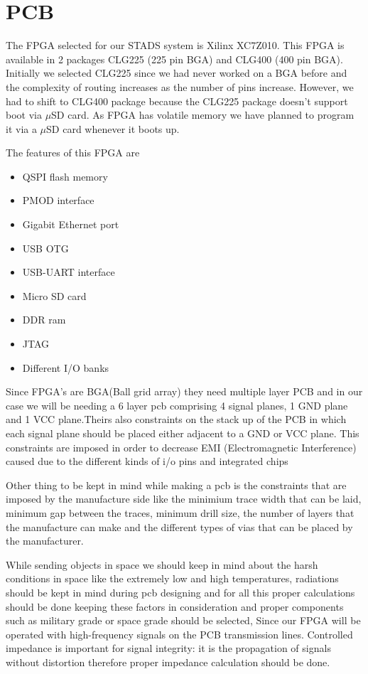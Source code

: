 \section{PCB}
\thispagestyle{fancy}

The FPGA selected for our STADS system is Xilinx XC7Z010. This FPGA is available in 2 packages CLG225 (225 pin BGA) and CLG400 (400 pin BGA). Initially we selected CLG225 since we had never worked on a BGA before and the complexity of routing increases as the number of pins increase. However, we had to shift to CLG400 package because the CLG225 package doesn't support boot via $\mu$SD card.  As FPGA has volatile memory we have planned to program it via a $\mu$SD card whenever it boots up.

The features of this FPGA are
\begin{itemize}
    \item {QSPI flash memory }
    \item {PMOD interface}
    \item {Gigabit Ethernet port}
    \item {USB OTG}
    \item {USB-UART interface}
    \item {Micro SD card}
    \item {DDR ram}
    \item {JTAG}
    \item {Different I/O banks}
\end{itemize}

Since FPGA's are BGA(Ball grid array) they need multiple layer PCB and in our case we will be needing a 6 layer pcb comprising 4 signal planes, 1 GND plane and 1 VCC plane.Theirs also constraints on the stack up of the PCB in which each signal plane should be placed either adjacent to a GND or VCC plane. This constraints are imposed in order to decrease EMI (Electromagnetic Interference) caused due to the different kinds of i/o pins and integrated chips

Other thing to be kept in mind while making a pcb is the constraints that are imposed by the manufacture side like the minimium trace width that can be laid, minimum gap between the traces, minimum drill size, the number of layers that the manufacture can make and the different types of vias that can be placed by the manufacturer.

While sending objects in space we should keep in mind about the harsh conditions in space like the extremely low and high temperatures, radiations should be kept in mind during pcb designing and for all this proper calculations should be done keeping these factors in consideration and proper components such as military grade or space grade should be selected, Since our FPGA will be operated with high-frequency signals on the PCB transmission lines. Controlled impedance is important for signal integrity: it is the propagation of signals without distortion therefore proper impedance calculation should be done.

